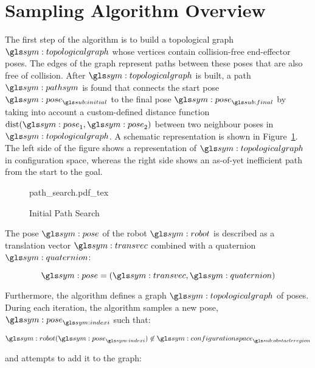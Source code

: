 \section{Sampling Algorithm Overview}%
\label{sec:algorithm_overview}


	The first step of the algorithm is to build a topological graph
	$\topologicalgraph$ whose vertices contain collision-free end-effector
	poses. The edges of the graph represent paths between these poses that are
	also free of collision.  After $\topologicalgraph$ is built, a path
	$\pathsym$ is found that connects the start pose $\pose_{\initial}$ to the
	final pose $\pose_{\final}$ by taking into account a custom-defined distance
	function $\dist(\pose_1, \pose_2)$ between two neighbour poses in
	$\topologicalgraph$. A schematic representation is shown in
	Figure~\ref{fig:path_search}. The left side of the figure shows a
	representation of $\topologicalgraph$ in configuration space, whereas the
	right side shows an as-of-yet inefficient path from the start to the goal.

	\begin{figure}[hb]
		\centering
		\def\svgwidth{\columnwidth}
		{path_search.pdf_tex}
		\caption{Initial Path Search}%
		\label{fig:path_search}
	\end{figure}


	The pose $\pose$ of the robot $\robot$ is described as a translation
	vector $\transvec$ combined with a quaternion $\quaternion$:

	\begin{equation}
		\pose = (\transvec, \quaternion)
	\end{equation}

	Furthermore, the algorithm defines a graph $\topologicalgraph$ of poses.
	During each iteration, the algorithm samples a new pose,
	$\pose_{\indexi}$ such that:

	\begin{equation}
		\robot(\pose_{\indexi}) \not\in
		\configurationspace_{\obstacleregion}
	\end{equation}

	and attempts to add it to the graph:

